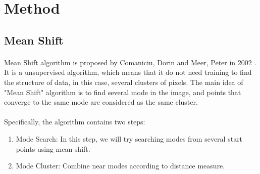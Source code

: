 \documentclass{gapd}
\begin{document}


\section{Method}
\label{sec:Method}
		
\subsection{Mean Shift}
\label{sec:mean shift}
\paragraph{}
	Mean Shift algorithm is proposed by Comaniciu, Dorin and Meer, Peter in 2002 \cite{comaniciu2002mean}. It is a unsupervised algorithm, which means that it do not need training to find the structure of data, in this case, several clusters of pixels. The main idea of "Mean Shift" algorithm is to find several mode in the image, and points that converge to the same mode are considered as the same cluster. 
\paragraph{}
	Specifically, the algorithm contains two steps: 
	\begin{enumerate}
		\item Mode Search: In this step, we will try searching modes from several start points using mean shift. 
		\item Mode Cluster: Combine near modes according to distance measure. 
	\end{enumerate}
\end{document}
